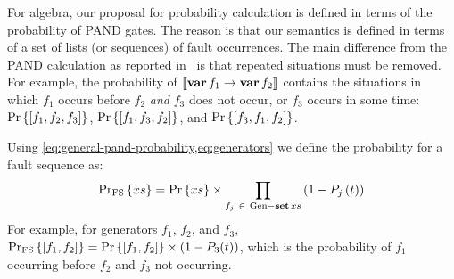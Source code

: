 For \ac{algebra}, our proposal for probability calculation is defined in terms of the probability of \ac{PAND} gates.
The reason is that our semantics is defined in terms of a set of lists (or sequences) of fault occurrences.
The main difference from the \ac{PAND} calculation as reported in~\cite{FAR1976} is that repeated situations must be removed.
For example, the probability of $\left[\!\left[\operatorname{\mathbf{var}} f_1 \rightarrow \operatorname{\mathbf{var}} f_2\right]\!\right]$ contains the situations in which $f_1$ occurs before $f_2$ \emph{and} $f_3$ does not occur, or $f_3$ occurs in some time: $\Pr\left\{\left[f_1,f_2,f_3\right]\right\}$, $\Pr\left\{\left[f_1,f_3,f_2\right]\right\}$, and $\Pr\left\{\left[f_3,f_1,f_2\right]\right\}$.
%
%
%

Using \cref{eq:general-pand-probability,eq:generators} we define the probability for a fault sequence as:
%
\begin{equation}
\mathrm{Pr_{FS}}\left\{xs\right\} = 
  \Pr\left\{xs\right\} \times \prod_{f_j ~\in~ \mathrm{Gen} - \operatorname{\mathbf{set}} xs} \left(1-P_j\left(t\right)\right)\label{eq:denotational-probability}
\end{equation}
%
%
For example, for generators $f_1$, $f_2$, and $f_3$, $\mathrm{Pr_{FS}}\left\{\left[f_1,f_2\right]\right\} = \Pr\left\{\left[f_1,f_2\right]\right\}\times\left(1-P_3(t)\right)$, which is the probability of $f_1$ occurring before $f_2$ and $f_3$ not occurring.


